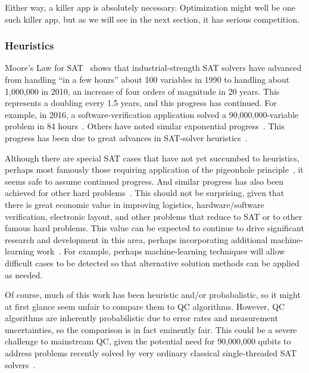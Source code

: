 Either way, a killer app is absolutely necessary.
Optimization might well be one such killer app, but as we will see in the
next section, it has serious competition.

\subsubsection{Heuristics}
\label{sec:future:Heuristics}

Moore's Law for SAT~\cite[Fig.~2.3]{Kroening:2008:DPA:1391237} shows
that industrial-strength SAT solvers have advanced from handling
``in a few hours'' about
100 variables in 1990 to handling about 1,000,000 in 2010, an increase
of four orders of magnitude in 20 years.
This represents a doubling every 1.5 years, and this progress has
continued.
For example, in 2016, a software-verification application solved a
90,000,000-variable problem in 84 hours~\cite{LihaoLiang2016VerifyTreeRCU}.
Others have noted similar exponential
progress~\cite{SharadMalik2010SATSolverHistory,SATCompetition2002,vanHarmelen:2007:HKR:1557461,Malik:2009:BST:1536616.1536637,JamesEzick2014ExtremeSAT}.
This progress has been due to great advances in SAT-solver
heuristics~\cite{Kroening:2008:DPA:1391237,Zhang:2002:QEB:647771.734434,SharadMalik2010SATSolverHistory,Malik:2009:BST:1536616.1536637,Audemard:2009:PLC:1661445.1661509}.

Although there are special SAT cases that have not yet succumbed to
heuristics, perhaps most famously those requiring application of the
pigeonhole principle~\cite[page~38]{Kroening:2008:DPA:1391237},
it seems safe to assume continued progress.
And similar progress has also been achieved for other hard
problems~\cite{WikipediaPrimalityTest,WikipediaTSP,WikipediaIntegerFactorization}.
This should not be surprising, given that there is great economic value
in improving logistics, hardware/software verification, electronic layout,
and other problems that reduce to SAT or to other famous hard problems.
This value can be expected to continue to drive significant research
and development in this area, perhaps incorporating additional
machine-learning work~\cite{ShaiHaim2009SAT-MachineLearning}.
For example, perhaps machine-learning techniques will allow difficult
cases to be detected so that alternative solution methods can be applied
as needed.

Of course, much of this work has been heuristic and/or probabalistic,
so it might at first glance seem unfair to compare them to
QC algorithms.
However, QC algorithms are inherently probabilistic due to error rates
and measurement uncertainties, so the comparison is in fact eminently
fair.
This could be a severe challenge to mainstream QC, given the potential
need for 90,000,000 qubits to address problems recently solved by
very ordinary classical single-threaded SAT
solvers~\cite{LihaoLiang2016VerifyTreeRCU}.


